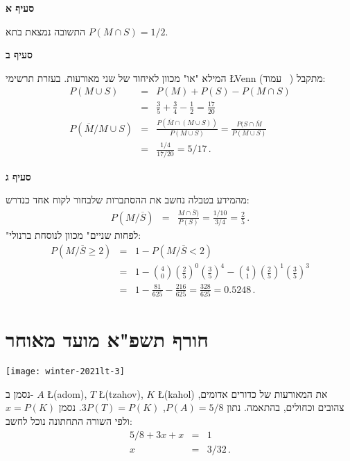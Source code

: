 \textbf{סעיף א}

התשובה נמצאת בתא 
$P(M\cap S)=1/2$.

\textbf{סעיף ב}

המילא "או" מכוון לאיחוד של שני מאורעות. בעזרת תרשימי 
\L{Venn}
(עמוד~%
\pageref{p.venn})
מתקבל:
\begin{eqnarray*}
P(M\cup S) &=&P(M)+P(S)-P(M\cap S)\\[6pt]
&=&\frac{3}{5}+\frac{3}{4}-\frac{1}{2}=\frac{17}{20}\\[6pt]
P(\overline{M}/M\cup S)&=&\frac{P(\overline{M}\cap (M\cup S))}{P(M\cup S)}=\frac{P(S\cap \overline{M}}{P(M\cup S)}\\[6pt]
&=&\frac{1/4}{17/20}=5/17\,.
\end{eqnarray*}

\textbf{סעיף ג}

מהמידע בטבלה נחשב את ההסתברות שלבחור לקוח אחד כנדרש:
\begin{eqnarray*}
P(M/\overline{S})&=&\frac{M\cap\overline{S})}{P(S)}=\frac{1/10}{3/4}=\frac{2}{5}\,.
\end{eqnarray*}
"לפחות שניים" מכוון לנוסחת ברנולי:
\begin{eqnarray*}
P(M/\overline{S}\geq 2)&=&1-P(M/\overline{S}<2)\\
&=&1-{4\choose 0}\left(\frac{2}{5}\right)^0\left(\frac{3}{5}\right)^4-{4\choose 1}\left(\frac{2}{5}\right)^1\left(\frac{3}{5}\right)^3\\
&=&1-\frac{81}{625}-\frac{216}{625}=\frac{328}{625}=0.5248\,.
\end{eqnarray*}


\newpage

\section{חורף תשפ"א מועד מאוחר}

\begin{center}
\texttt{[image: winter-2021lt-3]}
\end{center}

נסמן ב-%
$A$ \L{(adom)}, $T$ \L{(tzahov)}, $K$ \L{(kahol)}
את המאורעות של כדורים אדומים, צהובים וכחולים, בהתאמה. נתון
$P(A)=5/8$, $3P(T)=P(K)$.
נסמן
$x=P(K)$
ולפי השורה התחתונה נוכל לחשב:
\begin{eqnarray*}
5/8+3x+x&=&1\\
x&=&3/32\,.
\end{eqnarray*}

